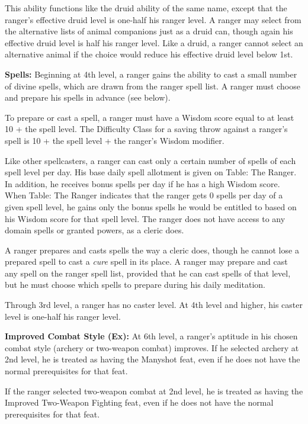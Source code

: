 This ability functions like the druid ability of the same name, except that the 
ranger's effective druid level is one-half his ranger level. A ranger may select 
from the alternative lists of animal companions just as a druid can, though again 
his effective druid level is half his ranger level. Like a druid, a ranger cannot 
select an alternative animal if the choice would reduce his effective druid level 
below 1st.

\textbf{Spells:} Beginning at 4th level, a ranger gains the ability to cast a small 
number of divine spells, which are drawn from the ranger spell list. A ranger must 
choose and prepare his spells in advance (see below).

To prepare or cast a spell, a ranger must have a Wisdom score equal to at least 
10 + the spell level. The Difficulty Class for a saving throw against a ranger's 
spell is 10 + the spell level + the ranger's Wisdom modifier.

Like other spellcasters, a ranger can cast only a certain number of spells of each 
spell level per day. His base daily spell allotment is given on Table: The Ranger. 
In addition, he receives bonus spells per day if he has a high Wisdom score. When 
Table: The Ranger indicates that the ranger gets 0 spells per day of a given spell 
level, he gains only the bonus spells he would be entitled to based on his Wisdom 
score for that spell level. The ranger does not have access to any domain spells 
or granted powers, as a cleric does.

A ranger prepares and casts spells the way a cleric does, though he cannot lose 
a prepared spell to cast a \textit{cure} spell in its place. A ranger may prepare 
and cast any spell on the ranger spell list, provided that he can cast spells of 
that level, but he must choose which spells to prepare during his daily meditation.

Through 3rd level, a ranger has no caster level. At 4th level and higher, his caster 
level is one-half his ranger level.

\textbf{Improved Combat Style (Ex):} At 6th level, a ranger's aptitude in his chosen 
combat style (archery or two-weapon combat) improves. If he selected archery at 
2nd level, he is treated as having the Manyshot feat, even if he does not have 
the normal prerequisites for that feat.

If the ranger selected two-weapon combat at 2nd level, he is treated as having 
the Improved Two-Weapon Fighting feat, even if he does not have the normal prerequisites 
for that feat.

